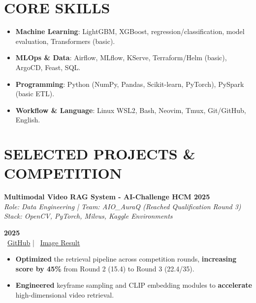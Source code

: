 \documentclass[a4paper,10pt]{extarticle}
\begin{document}
\section*{CORE SKILLS}
\begin{itemize}
    \item \textbf{Machine Learning}: LightGBM, XGBoost, regression/classification, model evaluation, Transformers (basic).
    \item \textbf{MLOps \& Data}: Airflow, MLflow, KServe, Terraform/Helm (basic), ArgoCD, Feast, SQL.
    \item \textbf{Programming}: Python (NumPy, Pandas, Scikit-learn, PyTorch), PySpark (basic ETL).
    \item \textbf{Workflow \& Language}: Linux WSL2, Bash, Neovim, Tmux, Git/GitHub, English.
\end{itemize}

\vspace{2pt}

\section*{SELECTED PROJECTS \& COMPETITION}
\noindent
\begin{minipage}[t]{0.73\textwidth}
    \textbf{Multimodal Video RAG System - AI-Challenge HCM 2025} \\
    \textit{Role: Data Engineering | Team: AIO\_AuraQ (Reached Qualification Round 3)} \\
    \textit{Stack: OpenCV, PyTorch, Milvus, Kaggle Environments}
\end{minipage}
\hfill
\begin{minipage}[t]{0.24\textwidth}
    \begin{flushright}
    \small
    \textbf{2025} \\
    \faGithub\ \href{https://github.com/dtmhdev89/HCMAI2025_Baseline}{GitHub} \;|\; \faChartLine\ \href{https://drive.google.com/drive/folders/1oUb_0HdjAEWWK0tl9sLHoYQfvCMphqZv?hl=vi}{Image Result}
    \end{flushright}
\end{minipage}

\begin{itemize}
    \item \textbf{Optimized} the retrieval pipeline across competition rounds, \textbf{increasing score by 45\%} from Round 2 (15.4) to Round 3 (22.4/35).
    \item \textbf{Engineered} keyframe sampling and CLIP embedding modules to \textbf{accelerate} high-dimensional video retrieval.
\end{itemize}
\end{document}
